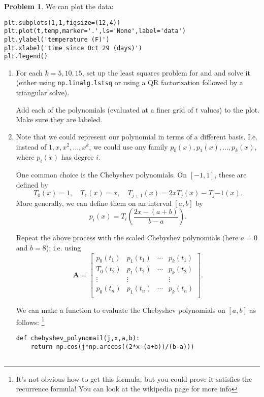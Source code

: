 \documentclass[12pt]{article}
\theoremstyle{definition}
\newtheorem{problem}{Problem}
\renewcommand{\vec}{\mathbf}
\begin{document}
\begin{problem}
    We can plot the data:
    \begin{lstlisting}
plt.subplots(1,1,figsize=(12,4))
plt.plot(t,temp,marker='.',ls='None',label='data')
plt.ylabel('temperature (F)')
plt.xlabel('time since Oct 29 (days)')
plt.legend()
    \end{lstlisting}


    \begin{enumerate}
        \item 
        
        For each $k=5, 10, 15$, set up the least squares problem for and and solve it (either using \texttt{np.linalg.lstsq} or using a QR factorization followed by a triangular solve).

        Add each of the polynomials (evaluated at a finer grid of $t$ values) to the plot. Make sure they are labeled. 
    
        \item Note that we could represent our polynomial in terms of a different basis. I.e. instead of $1, x, x^2, \ldots, x^k$, we could use any family $p_0(x), p_1(x), \ldots, p_k(x)$, where $p_i(x)$ has degree $i$. 
        
        One common choice is the Chebyshev polynomials. On $[-1,1]$, these are  defined by
        \[
        T_{0}(x) = 1, \quad T_{1}(x) = x, \quad T_{j+1}(x) = 2xT_j(x) - T_j{-1}(x).
        \]
        More generally, we can define them on an interval $[a,b]$ by 
        \[
        p_i(x) = T_i\left(\frac{2x - (a+b)}{b-a}\right).
        \]

        Repeat the above process with the scaled Chebyshev polynomials (here $a=0$ and $b=8$); i.e. using 
        \[
        \vec{A} = 
        \begin{bmatrix}
        p_0(t_1) & p_1(t_1) & \cdots & p_k(t_1) \\
        T_0(t_2) & p_1(t_2) & \cdots & p_k(t_2) \\
        \vdots & \vdots & & \vdots \\
        p_0(t_n) & p_1(t_n) & \cdots & p_k(t_n) \\
        \end{bmatrix}.
        \]

        We can make a function to evaluate the Chebyshev polynomials on $[a,b]$ as follows: \footnote{It's not obvious how to get this formula, but you could prove it satisfies the recurrence formula! You can look at the wikipedia page for more info}
        \begin{lstlisting}
def chebyshev_polynomail(j,x,a,b):
    return np.cos(j*np.arccos((2*x-(a+b))/(b-a)))
                    

\end{lstlisting}
\end{enumerate}
\end{problem}
\end{document}
